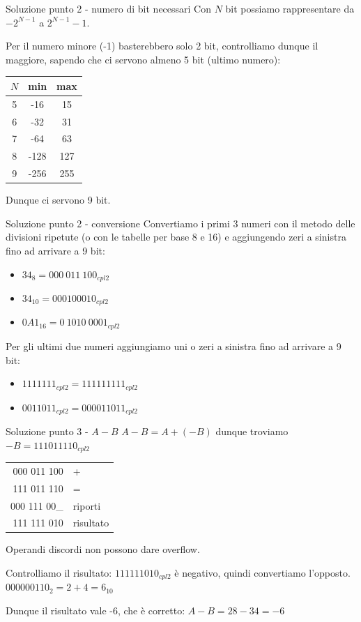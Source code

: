 \documentclass[9pt, handout]{beamer}
\begin{document}
\begin{frame}{Soluzione punto 2 - numero di bit necessari}
Con $N$ bit possiamo rappresentare da $-2^{N-1}$ a $2^{N-1}-1$.

\pause

Per il numero minore (-1) basterebbero solo 2 bit, controlliamo dunque il maggiore, sapendo che ci servono almeno 5 bit (ultimo numero):

\pause
\begin{center}
\begin{tabular}{ccc}
	$N$	&	min	&	max	\\
	\hline
	5	&	-16	&	15	\\
	6	&	-32	&	31	\\
	7	&	-64	&	63	\\
	8	&	-128&	127	\\
	9	&	-256&	255 \\
\end{tabular}
\end{center}

Dunque ci servono 9 bit.
\end{frame}

\begin{frame}{Soluzione punto 2 - conversione}
Convertiamo i primi 3 numeri con il metodo delle divisioni ripetute (o con le tabelle per base 8 e 16) e aggiungendo zeri a sinistra fino ad arrivare a 9 bit:
	\begin{itemize}
		\item $34_8 = 000\ 011\ 100_{cpl2}$
		\item $34_{10} = 000100010_{cpl2}$
		\item $0A1_{16} = 0\ 1010\ 0001_{cpl2}$
	\end{itemize}

\pause
Per gli ultimi due numeri aggiungiamo uni o zeri a sinistra fino ad arrivare a 9 bit:
	\begin{itemize}
		\item $1111111_{cpl2} = 111111111_{cpl2}$
		\item $0011011_{cpl2} = 000011011_{cpl2}$
 	\end{itemize}
\end{frame}

\begin{frame}{Soluzione punto 3 - $A-B$}
$A-B = A + (-B)$ dunque troviamo $-B = 111011110_{cpl2}$

\pause
\begin{tabular}{r|l}
	000 011 100 & + \\
	111 011 110 & = \\
	\hline
	000 111 00\_&	riporti\\
	111 111 010	& risultato
\end{tabular}

\pause
Operandi discordi non possono dare overflow.

\pause
Controlliamo il risultato: $111111010 _{cpl2}$ è negativo, quindi convertiamo l'opposto.
$000000110_2 = 2+4 = 6_{10}$

Dunque il risultato vale -6, che è corretto: $A-B = 28-34 = -6$

\end{frame}
\end{document}
